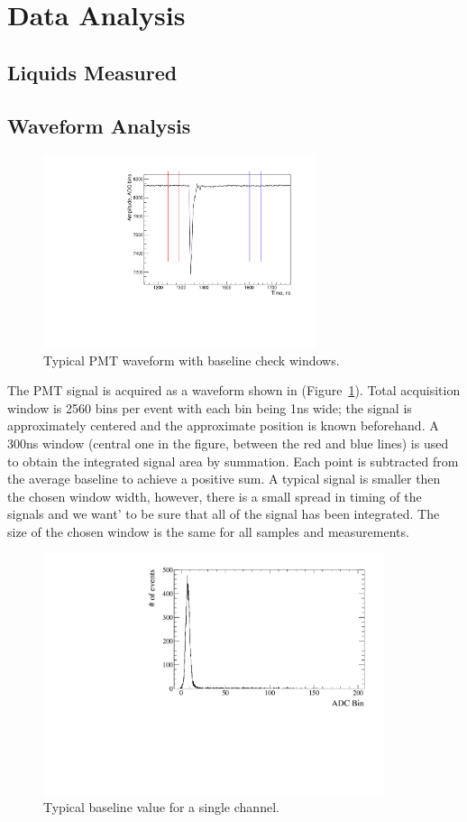 \documentclass[preprint,12pt]{elsarticle}
\begin{document}
 \section{Data Analysis}
\label{data analysis}
\subsection{Liquids Measured}


\subsection{Waveform Analysis}
\label{waveformanalysis}


\begin{figure}[ht]
\centering
\includegraphics[width=80mm]{PMTtypicalSignal.pdf}
\caption{Typical PMT waveform with baseline check windows.} \label{typicalpmtsignal}
\end{figure}

The PMT signal is acquired as a waveform shown in (Figure~\ref{typicalpmtsignal}). Total acquisition window is 2560 bins per event with each bin being 1ns wide; the signal is approximately centered and the approximate position is known beforehand. A 300ns window (central one in the figure, between the red and blue lines) is used to obtain the integrated signal area by summation. Each point is subtracted from the average baseline to achieve a positive sum. A typical signal is smaller then the chosen window width, however, there is a small spread in timing of the signals and we want' to be sure that all of the signal has been integrated. The size of the chosen window is the same for all samples and measurements.

\begin{figure}[ht]
\centering
\includegraphics[width=100mm]{baselineitself.pdf}
\caption{Typical baseline value for a single channel.} \label{typicalbaseline}
\end{figure}
\end{document}
